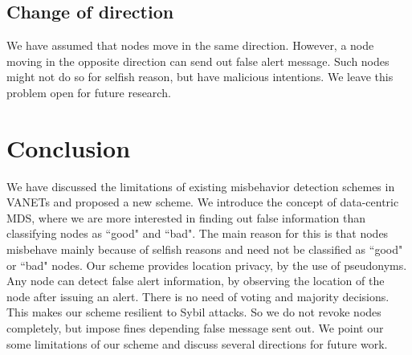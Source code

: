 \documentclass[conference]{IEEEtran}[10pt]
\begin{document}
\subsection{Change of direction}
We have assumed that nodes move in the same direction. However, a node moving in the opposite direction can send  out
false alert message. Such nodes might not do so for selfish reason, but have malicious intentions. 
We leave this problem open for future research. 

\section{Conclusion}
\label{sec:conclusion}
We have discussed the limitations of existing misbehavior detection schemes in VANETs and proposed a new scheme.
We introduce the concept of data-centric MDS, where we are more interested in finding out
false information than classifying nodes as ``good" and ``bad". 
The main reason for this is that nodes misbehave mainly because of selfish reasons and 
need not be classified as ``good" or ``bad" nodes. 
Our scheme provides location privacy, by the use of pseudonyms. 
Any node can detect false alert information, by observing the location of the node after issuing an alert. 
There is no need of voting and majority decisions. 
This makes our scheme resilient to Sybil attacks. 
So we do not revoke nodes completely, but impose fines depending false message sent out. 
We point our some limitations of our scheme and discuss several directions for future work. 
\end{document}
